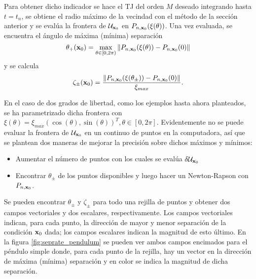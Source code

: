 Para obtener dicho indicador se hace el TJ del orden $M$ deseado integrando hasta $t = t_n$, se obtiene el radio máximo de la vecindad con el método de la sección anterior y se evalúa la frontera de $\mathcal{U}_{\mathbf{x}_0}$ en $P_{n,\mathbf{x}_0}(\xi(\theta))$. Una vez evaluada, se encuentra el ángulo de máxima (mínima) separación 
\begin{equation}
 \theta_{+}(\mathbf{x}_0) = \max_{\theta \in [0,2\pi)} \left\lVert P_{n,\mathbf{x}_0}(\xi(\theta)) - P_{n,\mathbf{x}_0}(0) \right\rVert
\end{equation} 
y se calcula 
\begin{equation}
 \zeta_{\pm}(\mathbf{x}_0) = \frac{ \left\lVert P_{n,\mathbf{x}_0}(\xi(\theta_{\pm})) - P_{n,\mathbf{x}_0}(0)\right\rVert }{\xi_{max}}.
 \label{eq:max_min_rate}
\end{equation}

En el caso de dos grados de libertad, como los ejemplos hasta ahora planteados, se ha parametrizado dicha frontera con $\xi(\theta) = \xi_{max} \left( \cos(\theta), \sin(\theta) \right)^T, \theta \in [0,2\pi]$. Evidentemente no se puede evaluar la frontera de $\mathcal{U}_{\mathbf{x}_0}$ en un continuo de puntos en la computadora, así que se plantean dos maneras de mejorar la precisión sobre dichos máximos y mínimos: 
\begin{itemize}
\item Aumentar el número de puntos con los cuales se evalúa $\delta \mathcal{U}_{\mathbf{x}_0}$
\item Encontrar $\theta_{\pm}$ de los puntos disponibles y luego hacer un Newton-Rapson con $P_{n,\mathbf{x}_0}$. 
\end{itemize} 

Se pueden encontrar $\theta_\pm$ y $\zeta_\pm$ para todo una rejilla de puntos y obtener dos campos vectoriales y dos escalares, respectivamente. Los campos vectoriales indican, para cada punto, la dirección de mayor y menor separación de la condición $\mathbf{x}_0$ dada; los campos escalares indican la magnitud de esto último. En la figura \ref{fig:seprate_pendulum} se pueden ver ambos campos encimados para el péndulo simple donde, para cada punto de la rejilla, hay un vector en la dirección de máxima (mínima) separación y en color se indica la magnitud de dicha separación.

